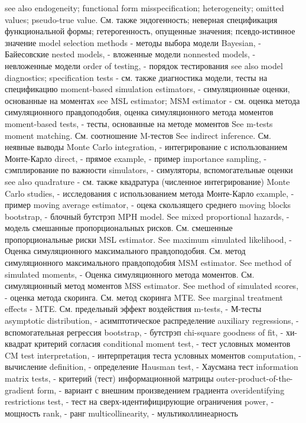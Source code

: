 see also endogeneity; functional form misspecification; heterogeneity; omitted values; pseudo-true value. См. также эндогенность; неверная спецификация функциональной формы; гетерогенность, опущенные значения; псевдо-истинное значение
model selection methods - методы выбора модели
Bayesian, - Байесовские
nested models, - вложенные модели
nonnested models, - невложенные модели
order of testing, - порядок тестирования
see also model diagnostics; specification tests - см. также диагностика модели, тесты на спецификацию
moment-based simulation estimators, - симуляционные оценки, основанные на моментах
see MSL estimator; MSM estimator - см. оценка метода симуляционного правдоподобия, оценка симуляционного метода моментов
moment-based tests, - тесты, основанные на методе моментов
See m-tests moment matching. См. соотношение M-тестов
See indirect inference. См. неявные выводы
Monte Carlo integration, - интегрирование с использованием Монте-Карло
direct, - прямое
example, - пример
importance sampling, - сэмплирование по важности
simulators, - симуляторы, вспомогательные оценки
see also quadrature - см. также квадратура (численное интегрирование)
Monte Carlo studies, - исследования с использованием метода Монте-Карло
example, - пример
moving average estimator, - оцека скользящего среднего
moving blocks bootstrap, - блочный бутстрэп
MPH model. See mixed proportional hazards, - модель смешанные пропорциональных рисков. См. смешенные пропорциональные риски
MSL estimator. See maximum simulated likelihood, - Оценка симуляционного максимального правдоподобия. См. метод симуляционного максимального правдоподобия
MSM estimator. See method of simulated moments, - Оценка симуляционного метода моментов. См. симуляционный метод моментов 
MSS estimator. See method of simulated scores, - оценка метода скоринга. См. метод скоринга
MTE. See marginal treatment effects - MTE. См. предельный эффект воздействия
m-tests, - М-тесты
asymptotic distribution, - асимптотическое распределение
auxiliary regressions, - вспомогательная регрессия
bootstrap, - бутстрэп
chi-square goodness of fit, - хи-квадрат критерий согласия
conditional moment test, - тест условных моментов
CM test interpretation, - интерпретация теста условных моментов
computation, - вычисление
definition, - определение
Hausman test, - Хаусмана тест
information matrix tests, - критерий (тест) информационной матрицы
outer-product-of-the-gradient form, - вариант с внешним произведением градиента
overidentifying restrictions test, - тест на сверх-идентифицирующие ограничения
power, - мощность
rank, - ранг
multicollinearity, - мультиколлинеарность
